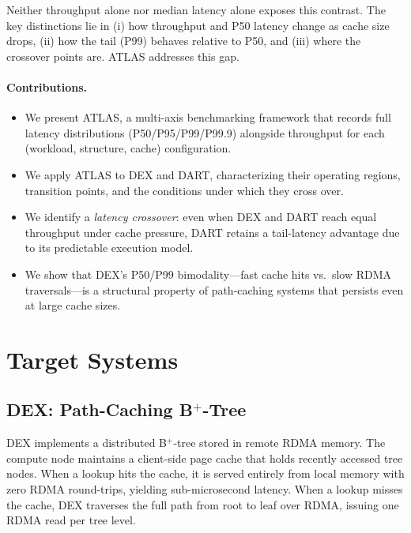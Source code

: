 \documentclass[sigconf, nonacm]{acmart}
\begin{document}
Neither throughput alone nor median latency alone exposes this contrast. The key distinctions lie in (i) how throughput and P50 latency change as cache size drops, (ii) how the tail (P99) behaves relative to P50, and (iii) where the crossover points are. ATLAS addresses this gap.

\paragraph{Contributions.}
\begin{itemize}
  \item We present ATLAS, a multi-axis benchmarking framework that records full latency distributions (P50/P95/P99/P99.9) alongside throughput for each (workload, structure, cache) configuration.
  \item We apply ATLAS to DEX and DART, characterizing their operating regions, transition points, and the conditions under which they cross over.
  \item We identify a \emph{latency crossover}: even when DEX and DART reach equal throughput under cache pressure, DART retains a tail-latency advantage due to its predictable execution model.
  \item We show that DEX's P50/P99 bimodality---fast cache hits vs.\ slow RDMA traversals---is a structural property of path-caching systems that persists even at large cache sizes.
\end{itemize}

\section{Target Systems}
\label{sec:systems}

\subsection{DEX: Path-Caching B$^+$-Tree}

DEX implements a distributed B$^+$-tree stored in remote RDMA memory. The compute node maintains a client-side page cache that holds recently accessed tree nodes. When a lookup hits the cache, it is served entirely from local memory with zero RDMA round-trips, yielding sub-microsecond latency. When a lookup misses the cache, DEX traverses the full path from root to leaf over RDMA, issuing one RDMA read per tree level.
\end{document}
